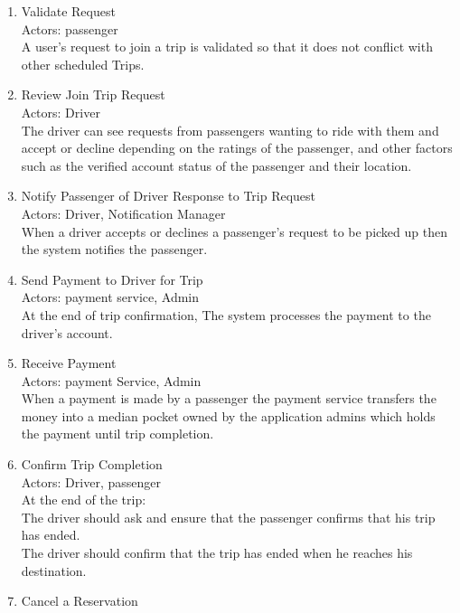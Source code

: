 \documentclass[a4paper, 12pt]{report} %
\begin{document}
\begin{enumerate}
                \item Validate Request \\
                    Actors: passenger \\ 
                    A user’s request to join a trip is validated so that it does not conflict with other scheduled Trips.
                \item Review Join Trip Request \\
                    Actors: Driver \\
                    The driver can see requests from passengers wanting to ride with them and accept or decline depending on the ratings of the passenger, and other factors such as the verified account status of the passenger and their location. 
                \item Notify Passenger of Driver Response to Trip Request\\
                    Actors: Driver, Notification Manager\\
                    When a driver accepts or declines a passenger’s request to be picked up then the system notifies the passenger.
                \item Send Payment to Driver for Trip\\
                    Actors: payment service, Admin\\
                    At the end of trip confirmation, The system processes the payment to the driver's account.
                \item Receive Payment\\
                    Actors: payment Service, Admin\\
                    When a payment is made by a passenger the payment service transfers the money into a median pocket owned by the application admins which holds the payment until trip completion.
                \item Confirm Trip Completion\\
                    Actors: Driver, passenger\\
                    At the end of the trip: \\
                        The driver should ask and ensure that the passenger confirms that his trip has ended. \\
                        The driver should confirm that the trip has ended when he reaches his destination.
                \item Cancel a Reservation\\

\end{enumerate}
\end{document}
